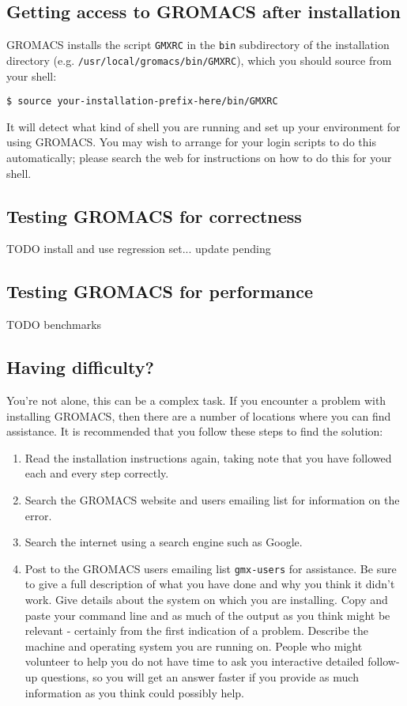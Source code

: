 \documentclass{article}[12pt,a4paper,twoside]
\newcommand{\gromacs}{GROMACS}
\begin{document}
\subsection{Getting access to \gromacs{} after installation}

\gromacs{} installs the script \texttt{GMXRC} in the \texttt{bin}
subdirectory of the installation directory
(e.g. \texttt{/usr/local/gromacs/bin/GMXRC}), which you should source
from your shell:
\begin{verbatim}
$ source your-installation-prefix-here/bin/GMXRC
\end{verbatim}

It will detect what kind of shell you are running and
set up your environment for using \gromacs{}. You may wish to arrange
for your login scripts to do this automatically; please search the web
for instructions on how to do this for your shell.

\subsection{Testing \gromacs{} for correctness}
TODO install and use regression set... update pending

\subsection{Testing \gromacs{} for performance}
TODO benchmarks

\subsection{Having difficulty?}

You're not alone, this can be a complex task. If you encounter a
problem with installing \gromacs{}, then there are a number of
locations where you can find assistance. It is recommended that you
follow these steps to find the solution:

\begin{enumerate}
\item Read the installation instructions again, taking note that you
  have followed each and every step correctly.
\item Search the \gromacs{} website and users emailing list for
  information on the error.
\item Search the internet using a search engine such as Google.
\item Post to the \gromacs{} users emailing list \texttt{gmx-users}
  for assistance. Be sure to give a full description of what you have
  done and why you think it didn't work. Give details about the system
  on which you are installing. Copy and paste your command line and as
  much of the output as you think might be relevant - certainly from
  the first indication of a problem. Describe the machine and
  operating system you are running on. People who might volunteer to
  help you do not have time to ask you interactive detailed follow-up
  questions, so you will get an answer faster if you provide as much
  information as you think could possibly help.
\end{enumerate}
\end{document}
